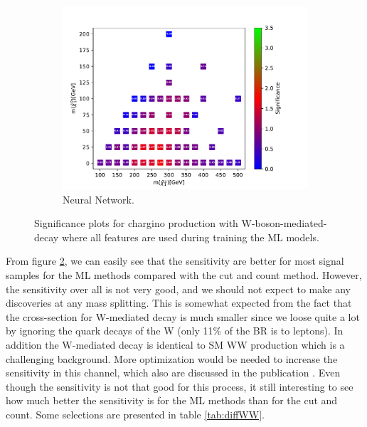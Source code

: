 \begin{figure}[H]
    \begin{subfigure}[t!]{0.49\textwidth}
    \includegraphics[width = \textwidth]{Figures/Significances/significance_NN_WW_All_level.pdf}
    \caption{Neural Network.}
        \label{fig:signAllWWNN}
    \end{subfigure}
    \caption{Significance plots for chargino production with W-boson-mediated-decay where all features are used during training the ML models.}
    \label{fig:signAllWW}
\end{figure}

From figure \ref{fig:signAllWW}, we can easily see that the sensitivity are better for most signal samples for the ML methods compared with the cut and count method. However, the sensitivity over all is not very good, and we should not expect to make any discoveries at any mass splitting. This is somewhat expected from the fact that the cross-section for W-mediated decay is much smaller since we loose quite a lot by ignoring the quark decays of the W (only 11\% of the BR is to leptons). In addition the W-mediated decay is identical to SM WW production which is a challenging background. More optimization would be needed to increase the sensitivity in this channel, which also are discussed in the publication \cite{sleptonexclusion}. Even though the sensitivity is not that good for this process, it still interesting to see how much better the sensitivity is for the ML methods than for the cut and count. Some selections are presented in table \ref{tab:diffWW}.




